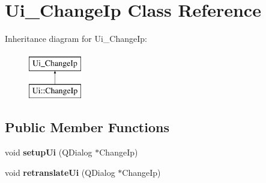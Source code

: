 \hypertarget{class_ui___change_ip}{\section{Ui\-\_\-\-Change\-Ip Class Reference}
\label{class_ui___change_ip}
}
Inheritance diagram for Ui\-\_\-\-Change\-Ip\-:\begin{figure}[H]
\begin{center}
\leavevmode
\includegraphics[height=2.000000cm]{class_ui___change_ip}
\end{center}
\end{figure}
\subsection*{Public Member Functions}
\begin{DoxyCompactItemize}
\item 
\hypertarget{class_ui___change_ip_ad83fb765cb65b3e228307ee20f2cf14c}{void {\bfseries setup\-Ui} (Q\-Dialog $\ast$Change\-Ip)}\label{class_ui___change_ip_ad83fb765cb65b3e228307ee20f2cf14c}

\item 
\hypertarget{class_ui___change_ip_ab14c280638d5b0c2e38c21ea316a5352}{void {\bfseries retranslate\-Ui} (Q\-Dialog $\ast$Change\-Ip)}\label{class_ui___change_ip_ab14c280638d5b0c2e38c21ea316a5352}

\end{DoxyCompactItemize}
